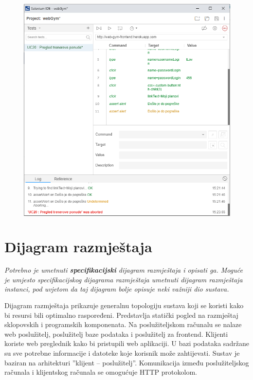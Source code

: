 					\begin{figure}[H]
        			\hspace*{-1.5cm}
        			\includegraphics[scale=0.5]{slike/error.PNG} %
        			\centering
        			\label{fig:promjene}
	        	\end{figure}
		 
			\eject 
			
			
		\section{Dijagram razmještaja}
		
		 \textit{Potrebno je umetnuti \textbf{specifikacijski} dijagram razmještaja i opisati ga. Moguće je umjesto specifikacijskog dijagrama razmještaja umetnuti dijagram razmještaja instanci, pod uvjetom da taj dijagram bolje opisuje neki važniji dio sustava.}
		
		Dijagram razmještaja prikazuje generalnu topologiju sustava koji se koristi kako bi resursi bili optimalno raspoređeni. Predstavlja statički pogled na razmještaj sklopovskih i programskih komponenata. Na poslužiteljskom računalu se nalaze web poslužitelj, poslužitelj baze podataka i poslužitelj za frontend. Klijenti koriste web preglednik kako bi pristupili web aplikaciji. U bazi podataka sadržane su sve potrebne informacije i datoteke koje korisnik može zahtijevati. Sustav je baziran na arhitekturi ”klijent – poslužitelj”. Komunikacija između poslužiteljskog računala i klijentskog računala se omogućuje HTTP protokolom. 
		
